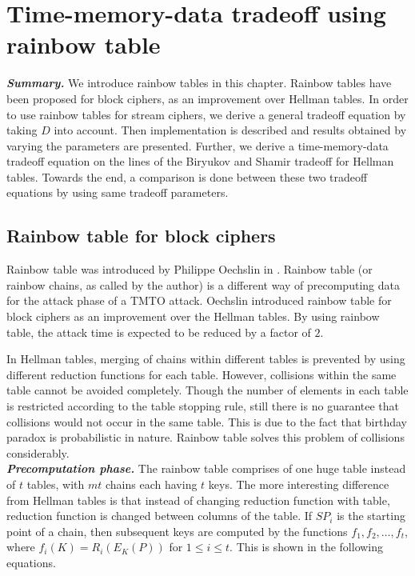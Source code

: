 \chapter{Time-memory-data tradeoff using rainbow table}
\label{chapter:tmdto-rainbow}

\indent \textbf{\textit{Summary.}} We introduce rainbow tables in this chapter. Rainbow tables have been proposed for block ciphers, as an improvement over Hellman tables. In order to use rainbow tables for stream ciphers, we derive a general tradeoff equation by taking $D$ into account. Then implementation is described and results obtained by varying the parameters are presented. Further, we derive a time-memory-data tradeoff equation on the lines of the Biryukov and Shamir tradeoff for Hellman tables. Towards the end, a comparison is done between these two tradeoff equations by using same tradeoff parameters.

\section{Rainbow table for block ciphers}
\label{sec:rainbow-block}

Rainbow table was introduced by Philippe Oechslin in \cite{oechslin:mfc}. Rainbow table (or rainbow chains, as called by the author) is a different way of precomputing data for the attack phase of a TMTO attack. Oechslin introduced rainbow table for block ciphers as an improvement over the Hellman tables. By using rainbow table, the attack time is expected to be reduced by a factor of $2$.

In Hellman tables, merging of chains within different tables is prevented by using different reduction functions for each table. However, collisions within the same table cannot be avoided completely. Though the number of elements in each table is restricted according to the table stopping rule, still there is no guarantee that collisions would not occur in the same table. This is due to the fact that birthday paradox is probabilistic in nature. Rainbow table solves this problem of collisions considerably.\\

\noindent \textit{\textbf{Precomputation phase.}} The rainbow table comprises of one huge table instead of $t$ tables, with $mt$ chains each having $t$ keys. The more interesting difference from Hellman tables is that instead of changing reduction function with table, reduction function is changed between columns of the table. If $SP_i$ is the starting point of a chain, then subsequent keys are computed by the functions \mbox{$f_1, f_2, \ldots, f_t$}, where $f_i(K) = R_i(E_{K}(P))$ for $1 \leq i \leq t$. This is shown in the following equations. 

